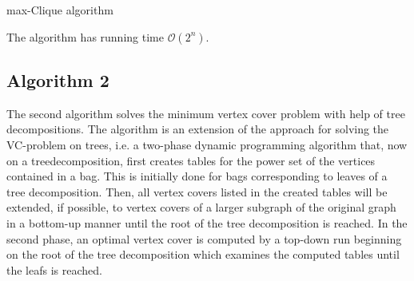 \documentclass[11pt,a4paper]{article}
\begin{document}
\begin{algorithm}[h!]
\caption{max-Clique algorithm}
\begin{algorithmic}[1]

\State{}

\EndFor
\EndFunction

\State{}


\EndIf
\Return
\EndIf


\Return
\EndIf

\Return
\EndIf


\Return
\EndIf
\EndWhile

\EndFunction
\end{algorithmic}
\end{algorithm}



The algorithm has running time $\mathcal{O}(2^{n})$.

\subsection{Algorithm 2}

The second algorithm solves the minimum vertex cover problem with help of tree decompositions. The algorithm is an extension of the approach for solving the VC-problem on trees, i.e. a two-phase dynamic programming algorithm that, now on a treedecomposition, first creates tables for the power set of the vertices contained in a bag. This is initially done for bags corresponding to leaves of a tree decomposition. Then, all vertex covers listed in the created tables will be extended, if possible, to vertex covers of a larger subgraph of the original graph in a bottom-up manner until the root of the tree decomposition is reached. In the second phase, an optimal vertex cover is computed by a top-down run beginning on the root of the tree decomposition which examines the computed tables until the leafs is reached. \\
\end{document}
